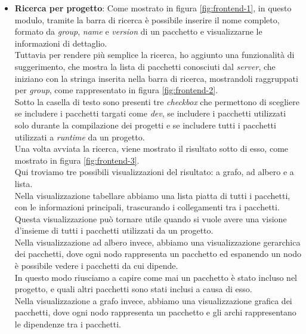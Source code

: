 \begin{itemize}
  \item \textbf{Ricerca per progetto}: Come mostrato in figura \ref*{fig:frontend-1}, in questo modulo, tramite la barra di ricerca
   è possibile inserire il nome completo, formato da \textit{group}, \textit{name} e \textit{version} di un pacchetto e visualizzarne
    le informazioni di dettaglio.\\
    Tuttavia per rendere più semplice la ricerca, ho aggiunto una funzionalità di suggerimento, che mostra la lista di pacchetti conosciuti dal 
    \textit{server}, che iniziano con la stringa inserita nella barra di ricerca, mostrandoli raggruppati per \textit{group}, come rappresentato in figura \ref*{fig:frontend-2}.\\
    Sotto la casella di testo sono presenti tre \textit{checkbox} che permettono di scegliere se includere i pacchetti targati come \textit{dev}, 
    se includere i pacchetti utilizzati solo durante la compilazione dei progetti e se includere tutti i pacchetti utilizzati a \textit{runtime}
    da un progetto.\\
    Una volta avviata la ricerca, viene mostrato il risultato sotto di esso, come mostrato in figura \ref*{fig:frontend-3}.\\
    Qui troviamo tre possibili visualizzazioni del risultato: a grafo, ad albero e a lista.\\
    Nella visualizzazione tabellare abbiamo una lista piatta di tutti i pacchetti, con le informazioni principali, trascurando i collegamenti tra i pacchetti.\\
    Questa visualizzazione può tornare utile quando si vuole avere una visione d'insieme di tutti i pacchetti utilizzati da un progetto.\\
    Nella visualizzazione ad albero invece, abbiamo una visualizzazione gerarchica dei pacchetti, dove ogni nodo rappresenta un pacchetto ed espanendo un nodo
    è possibile vedere i pacchetti da cui dipende.\\
    In questo modo riusciamo a capire come mai un pacchetto è stato incluso nel progetto, e quali altri pacchetti sono stati inclusi a causa di esso.\\
    Nella visualizzazione a grafo invece, abbiamo una visualizzazione grafica dei pacchetti, dove ogni nodo rappresenta un pacchetto e gli archi rappresentano
    le dipendenze tra i pacchetti.\\
    \begin{figure}[h]
      \centering
      \begin{minipage}{0.60\textwidth}

\end{minipage}
\end{figure}
\end{itemize}
